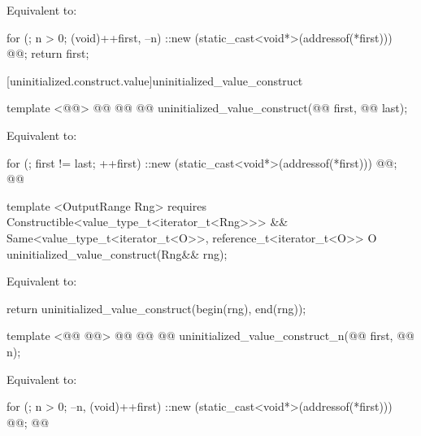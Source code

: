 \pnum
\effects Equivalent to:
\begin{codeblock}
        for (; n > 0; (void)++first, --n)
          ::new (static_cast<void*>(addressof(*first)))
            @@;
        return first;
\end{codeblock}

[uninitialized.construct.value]{uninitialized_value_construct}
\begin{codeblock}
  template <@@>
    @@
             @@
    @@ uninitialized_value_construct(@@ first, @@ last);
\end{codeblock}


\setcounter{Paras}{0}
\effects Equivalent to:
\begin{codeblock}
        for (; first != last; ++first)
          ::new (static_cast<void*>(addressof(*first)))
            @@;
        @@
\end{codeblock}
{\color{addclr}
\begin{codeblock}
  template <OutputRange Rng>
    requires Constructible<value_type_t<iterator_t<Rng>>> &&
             Same<value_type_t<iterator_t<O>>, reference_t<iterator_t<O>>
  O uninitialized_value_construct(Rng&& rng);
\end{codeblock}

\pnum
\effects Equivalent to:
\begin{codeblock}
      return uninitialized_value_construct(begin(rng), end(rng));
\end{codeblock}
} %

\begin{codeblock}
  template <@@ @@>
    @@
             @@
  @@
    uninitialized_value_construct_n(@@ first, @@ n);
\end{codeblock}

\pnum
\effects Equivalent to:
\begin{codeblock}
        for (; n > 0; --n, (void)++first)
          ::new (static_cast<void*>(addressof(*first)))
            @@;
        @@
\end{codeblock}

